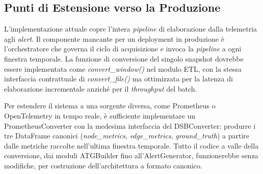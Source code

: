 \subsection{Punti di Estensione verso la Produzione}
\label{subsec:estensioni_produzione}

L'implementazione attuale copre l'intera \textit{pipeline} di elaborazione dalla telemetria
agli \textit{alert}. Il componente mancante per un deployment in produzione è l'orchestratore
che governa il ciclo di acquisizione e invoca la \textit{pipeline} a ogni finestra temporale.
La funzione di conversione del singolo snapshot dovrebbe essere implementata come
\textit{convert\_window()} nel modulo \gls{ETL}, con la stessa interfaccia contrattuale di
\textit{convert\_file()} ma ottimizzata per la latenza di elaborazione incrementale anziché
per il \textit{throughput} del batch.

Per estendere il sistema a una sorgente diversa, come Prometheus o OpenTelemetry in tempo reale,
è sufficiente implementare un PrometheusConverter con la medesima interfaccia del DSBConverter:
produrre i tre DataFrame canonici (\textit{node\_metrics}, \textit{edge\_metrics},
\textit{ground\_truth}) a partire dalle metriche raccolte nell'ultima finestra temporale.
Tutto il codice a valle della conversione, dai moduli ATGBuilder fino all'AlertGenerator,
funzionerebbe senza modifiche, per costruzione dell'architettura a formato canonico.